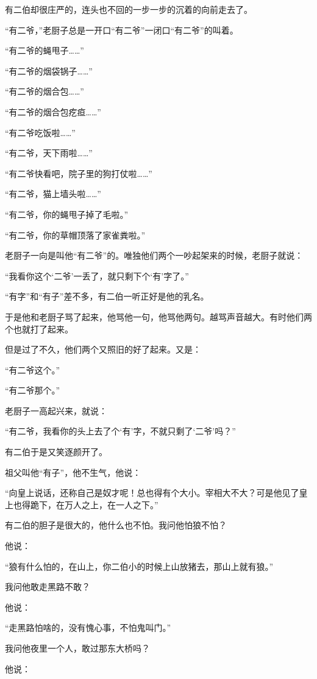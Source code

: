 \par 有二伯却很庄严的，连头也不回的一步一步的沉着的向前走去了。
\par “有二爷，”老厨子总是一开口“有二爷”一闭口“有二爷”的叫着。
\par “有二爷的蝇甩子……”
\par “有二爷的烟袋锅子……”
\par “有二爷的烟合包……”
\par “有二爷的烟合包疙疸……”
\par “有二爷吃饭啦……”
\par “有二爷，天下雨啦……”
\par “有二爷快看吧，院子里的狗打仗啦……”
\par “有二爷，猫上墙头啦……”
\par “有二爷，你的蝇甩子掉了毛啦。”
\par “有二爷，你的草帽顶落了家雀粪啦。”
\par 老厨子一向是叫他“有二爷”的。唯独他们两个一吵起架来的时候，老厨子就说：
\par “我看你这个‘二爷’一丢了，就只剩下个‘有’字了。”
\par “有字”和“有子”差不多，有二伯一听正好是他的乳名。
\par 于是他和老厨子骂了起来，他骂他一句，他骂他两句。越骂声音越大。有时他们两个也就打了起来。
\par 但是过了不久，他们两个又照旧的好了起来。又是：
\par “有二爷这个。”
\par “有二爷那个。”
\par 老厨子一高起兴来，就说：
\par “有二爷，我看你的头上去了个‘有’字，不就只剩了‘二爷’吗？”
\par 有二伯于是又笑逐颜开了。
\par 祖父叫他“有子”，他不生气，他说：
\par “向皇上说话，还称自己是奴才呢！总也得有个大小。宰相大不大？可是他见了皇上也得跪下，在万人之上，在一人之下。”
\par 有二伯的胆子是很大的，他什么也不怕。我问他怕狼不怕？
\par 他说：
\par “狼有什么怕的，在山上，你二伯小的时候上山放猪去，那山上就有狼。”
\par 我问他敢走黑路不敢？
\par 他说：
\par “走黑路怕啥的，没有愧心事，不怕鬼叫门。”
\par 我问他夜里一个人，敢过那东大桥吗？
\par 他说：
